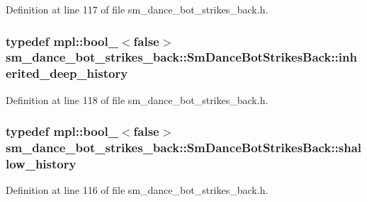 Definition at line 117 of file sm\+\_\+dance\+\_\+bot\+\_\+strikes\+\_\+back.\+h.

\subsubsection[{\texorpdfstring{inherited\+\_\+deep\+\_\+history}{inherited_deep_history}}]{\setlength{\rightskip}{0pt plus 5cm}typedef mpl\+::bool\+\_\+$<$false$>$ {\bf sm\+\_\+dance\+\_\+bot\+\_\+strikes\+\_\+back\+::\+Sm\+Dance\+Bot\+Strikes\+Back\+::inherited\+\_\+deep\+\_\+history}}\hypertarget{structsm__dance__bot__strikes__back_1_1SmDanceBotStrikesBack_aca174eb9bc9f50083f00b8bb1946fb6b}{}\label{structsm__dance__bot__strikes__back_1_1SmDanceBotStrikesBack_aca174eb9bc9f50083f00b8bb1946fb6b}


Definition at line 118 of file sm\+\_\+dance\+\_\+bot\+\_\+strikes\+\_\+back.\+h.

\subsubsection[{\texorpdfstring{shallow\+\_\+history}{shallow_history}}]{\setlength{\rightskip}{0pt plus 5cm}typedef mpl\+::bool\+\_\+$<$false$>$ {\bf sm\+\_\+dance\+\_\+bot\+\_\+strikes\+\_\+back\+::\+Sm\+Dance\+Bot\+Strikes\+Back\+::shallow\+\_\+history}}\hypertarget{structsm__dance__bot__strikes__back_1_1SmDanceBotStrikesBack_a193a12436ca97e49e143e642f314656b}{}\label{structsm__dance__bot__strikes__back_1_1SmDanceBotStrikesBack_a193a12436ca97e49e143e642f314656b}


Definition at line 116 of file sm\+\_\+dance\+\_\+bot\+\_\+strikes\+\_\+back.\+h.



